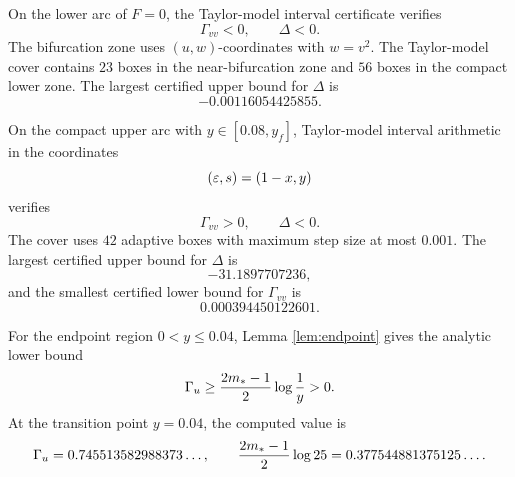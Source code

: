 \begin{proposition}\label{prop:A7}
On the lower arc of \(F=0\), the Taylor-model interval certificate verifies
\begin{equation}\label{eq:lower_det_app}
  \Gamma_{vv}<0,
  \qquad
  \Delta<0.
\end{equation}
The bifurcation zone uses \((u,w)\)-coordinates with \(w=v^2\).  The
Taylor-model cover contains \(23\) boxes in the near-bifurcation zone and
\(56\) boxes in the compact lower zone.  The largest certified upper bound for
\(\Delta\) is
\begin{equation}\label{eq:lower_margin_app}
  -0.00116054425855.
\end{equation}
\end{proposition}

\begin{proposition}\label{prop:A8}
On the compact upper arc with \(y\in[0.08,y_f]\), Taylor-model interval
arithmetic in the coordinates
\[
  (\varepsilon,s)=(1-x,y)
\]
verifies
\begin{equation}\label{eq:upper_det_app}
  \Gamma_{vv}>0,
  \qquad
  \Delta<0.
\end{equation}
The cover uses \(42\) adaptive boxes with maximum step size at most \(0.001\).
The largest certified upper bound for \(\Delta\) is
\begin{equation}\label{eq:upper_margin_app}
  -31.1897707236,
\end{equation}
and the smallest certified lower bound for \(\Gamma_{vv}\) is
\begin{equation}\label{eq:upper_gvv_margin_app}
  0.000394450122601.
\end{equation}
\end{proposition}

\begin{proposition}\label{prop:A9}
For the endpoint region \(0<y\le0.04\), Lemma \ref{lem:endpoint} gives the
analytic lower bound
\begin{equation}\label{eq:A9_endpoint}
  \Gamma_u\ge\frac{2m_*-1}{2}\log\frac1y>0.
\end{equation}
At the transition point \(y=0.04\), the computed value is
\begin{equation}\label{eq:endpoint_numeric_app}
  \Gamma_u=0.745513582988373\ldots,
  \qquad
  \frac{2m_*-1}{2}\log25=0.377544881375125\ldots .
\end{equation}
\end{proposition}


